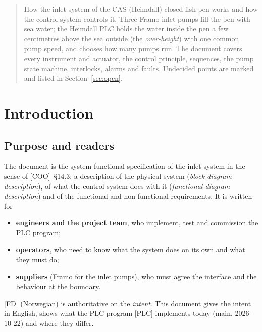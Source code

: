\documentclass[11pt,a4paper]{article}
\begin{document}
\maketitle
\thispagestyle{fancy}

\begin{abstract}
\noindent How the inlet system of the CAS (Heimdall) closed fish pen works and how the control system
controls it. Three Framo inlet pumps fill the pen with sea water; the Heimdall PLC holds the water inside
the pen a few centimetres above the sea outside (the \emph{over-height}) with one common pump speed, and
chooses how many pumps run. The
document covers every instrument and actuator, the control principle, sequences, the pump state machine,
interlocks, alarms and faults. Undecided points are marked  and listed in Section~\ref{sec:open}.
\end{abstract}

{\small\setlength{\parskip}{0pt}
\begin{multicols}{2}
\tableofcontents
\end{multicols}}

\section{Introduction}
\label{sec:intro}

\subsection{Purpose and readers}
The document is the system functional specification of the inlet system in the sense of
[COO]~\S14.3: a description of the physical system (\emph{block diagram description}), of what the
control system does with it (\emph{functional diagram description}) and of the functional and
non-functional requirements. It is written for
\begin{itemize}[nosep]
  \item \textbf{engineers and the project team}, who implement, test and commission the PLC program;
  \item \textbf{operators}, who need to know what the system does on its own and what they must do;
  \item \textbf{suppliers} (Framo for the inlet pumps), who must agree the interface and the behaviour
        at the boundary.
\end{itemize}
[FD] (Norwegian) is authoritative on the \emph{intent}. This document gives the intent in English,
shows what the PLC program [PLC] implements today (main, 2026-10-22) and where they differ.
\end{document}
